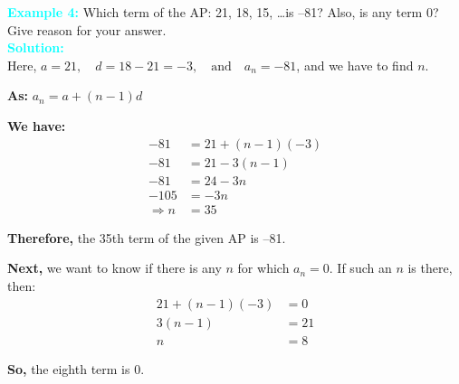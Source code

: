 \documentclass[a4paper,12pt]{article}
\begin{document}
\vspace{0.5em}
\noindent\textbf{\textcolor{cyan}{Example 4:}}
Which term of the AP: 21, 18, 15, \ldots is –81? Also, is any term 0? Give  reason for your answer. \\
\noindent\textbf{\textcolor{cyan}{Solution:}}\\  
Here, \(a = 21, \quad d = 18 - 21 = -3, \quad \text{and} \quad a_n = -81\), and we have to find \(n\).

\noindent\textbf{As:}\hspace{5.3cm} \(a_n = a + (n - 1)d\)

\noindent\textbf{We have:}
\begin{align*}
-81 &= 21 + (n - 1)(-3) \\
-81 &= 21 - 3(n - 1) \\
-81 &= 24 - 3n \\
-105 &= -3n \\
\Rightarrow n &= 35
\end{align*}

\noindent\textbf{Therefore,} the 35th term of the given AP is –81.

\noindent\textbf{Next,} we want to know if there is any \(n\) for which \(a_n = 0\). If such an \(n\) is there, then:
\begin{align*}
21 + (n - 1)(-3) &= 0 \\
3(n - 1) &= 21 \\
n &= 8
\end{align*}

\noindent\textbf{So,} the eighth term is 0.
\end{document}

